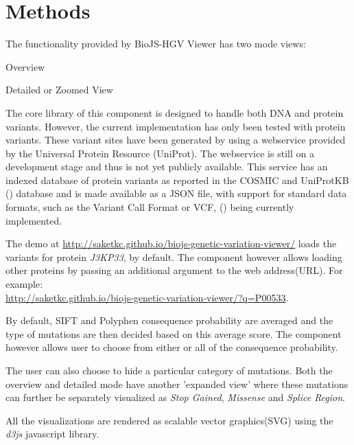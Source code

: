 \documentclass{bioinfo}
\begin{document}
\section{Methods}
The functionality provided by BioJS-HGV Viewer has two mode views: 
\begin{inparaenum}[(a)]
	\item Overview
	\item Detailed or Zoomed View
\end{inparaenum}

The core library of this component is designed to handle both DNA and protein variants. However, the current implementation has only been tested with protein variants. These variant sites have been generated by using a webservice provided by the Universal Protein Resource (UniProt). The webservice is still on a development stage and thus is not yet publicly available. This service has an indexed database of protein variants as reported in the COSMIC and UniProtKB (\cite{Wu2006}) database and is made available as a JSON file, with support for standard data formats, such as the Variant Call Format or VCF, (\cite{danecek2011variant}) being currently implemented.



The demo at \href{http://saketkc.github.io/biojs-genetic-variation-viewer/}{http://saketkc.github.io/biojs-genetic-variation-viewer/} loads the variants for protein \textit{J3KP33}, by default. The component however allows loading other proteins by passing an additional argument to the web address(URL). For example:\\ \href{http://saketkc.github.io/biojs-genetic-variation-viewer/?q=P00533}{http://saketkc.github.io/biojs-genetic-variation-viewer/?q=P00533}.

By default, SIFT and Polyphen consequence probability are averaged and the type of mutations are then decided based on this average score. The component however allows user to choose from either or all of the consequence probability.

The user can also choose to hide a particular category of mutations. Both the overview and detailed mode have another 'expanded view' where these mutations can further be separately visualized as \textit{Stop Gained}, \textit{Missense} and \textit{Splice Region}.

All the visualizations are rendered as scalable vector graphics(SVG) using the \textit{d3js} javascript library.
\end{document}
